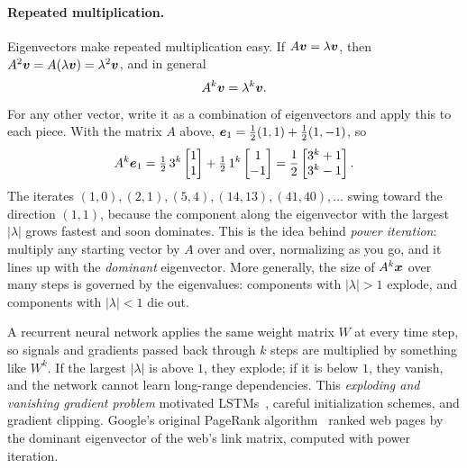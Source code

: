 \paragraph{Repeated multiplication.}
Eigenvectors make repeated multiplication easy. If $A\bm{v} =
\lambda\bm{v}$, then $A^2\bm{v} = A(\lambda\bm{v}) =
\lambda^2\bm{v}$, and in general
\[
  A^k \bm{v} = \lambda^k \bm{v} .
\]
For any other vector, write it as a combination of eigenvectors and apply
this to each piece. With the matrix $A$ above, $\bm{e}_1 = \tfrac12 (1,
1) + \tfrac12 (1, -1)$, so
\[
  A^k \bm{e}_1
  = \tfrac12\, 3^k \begin{bmatrix} 1 \\ 1 \end{bmatrix}
  + \tfrac12\, 1^k \begin{bmatrix} 1 \\ -1 \end{bmatrix}
  = \frac12 \begin{bmatrix} 3^k + 1 \\ 3^k - 1 \end{bmatrix}.
\]
The iterates $(1, 0), (2, 1), (5, 4), (14, 13), (41, 40), \dots$ swing
toward the direction $(1, 1)$, because the component along the
eigenvector with the largest $|\lambda|$ grows fastest and soon dominates.
This is the idea behind \emph{power iteration}: multiply any starting
vector by $A$ over and over, normalizing as you go, and it lines up with
the \emph{dominant} eigenvector. More generally, the size of $A^k\bm{x}$
over many steps is governed by the eigenvalues: components with
$|\lambda| > 1$ explode, and components with $|\lambda| < 1$ die out.

\begin{aibox}
  A recurrent neural network applies the same weight matrix $W$ at every
  time step, so signals and gradients passed back through $k$ steps are
  multiplied by something like $W^k$. If the largest $|\lambda|$ is above
  $1$, they explode; if it is below $1$, they vanish, and the network
  cannot learn long-range dependencies. This \emph{exploding and vanishing
  gradient problem} motivated LSTMs~\cite{hochreiter1997lstm}, careful
  initialization schemes, and gradient clipping. Google's original
  PageRank algorithm~\cite{brin1998pagerank} ranked web pages
  by the dominant eigenvector of the web's link matrix, computed with
  power iteration.
\end{aibox}

